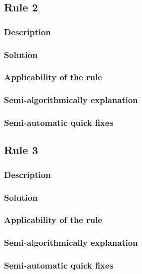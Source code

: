 \subsection{Rule 2}
\subsubsection{Description}
\subsubsection{Solution} 
\subsubsection{Applicability of the rule}
\subsubsection{Semi-algorithmically explanation}
\subsubsection{Semi-automatic quick fixes} 

\subsection{Rule 3}
\subsubsection{Description}
\subsubsection{Solution} 
\subsubsection{Applicability of the rule}
\subsubsection{Semi-algorithmically explanation}
\subsubsection{Semi-automatic quick fixes}  





